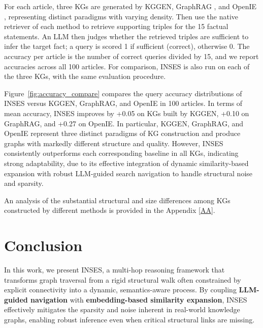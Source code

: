 \documentclass{article}
\theoremstyle{plain}
\theoremstyle{definition}
\theoremstyle{remark}
\begin{document}
For each article, three KGs are generated by KGGEN, GraphRAG \citep{edge2024local}, and OpenIE \citep{angeli2015leveraging}, representing distinct paradigms with varying density. Then use the native retriever of each method to retrieve supporting triples for the 15 factual statements. An LLM then judges whether the retrieved triples are sufficient to infer the target fact; a query is scored 1 if sufficient (correct), otherwise 0. The accuracy per article is the number of correct queries divided by 15, and we report accuracies across all 100 articles. For comparison, INSES is also run on each of the three KGs, with the same evaluation procedure. 

Figure~\ref{fig:accuracy_compare} compares the query accuracy distributions of INSES versus KGGEN, GraphRAG, and OpenIE in 100 articles. In terms of mean accuracy, INSES improves by +0.05 on KGs built by KGGEN, +0.10 on GraphRAG, and +0.27 on OpenIE. In particular, KGGEN, GraphRAG, and OpenIE represent three distinct paradigms of KG construction and produce graphs with markedly different structure and quality. However, INSES consistently outperforms each corresponding baseline in all KGs, indicating strong adaptability, due to its effective integration of dynamic similarity-based expansion with robust LLM-guided search navigation to handle structural noise and sparsity.

An analysis of the substantial structural and size differences among KGs constructed by different methods is provided in the Appendix \ref{AA}.

\section{Conclusion}
In this work, we present INSES, a multi-hop reasoning framework that transforms graph traversal from a rigid structural walk often constrained by explicit connectivity into a dynamic, semantics-aware process. By coupling \textbf{LLM-guided navigation} with \textbf{embedding-based similarity expansion}, INSES effectively mitigates the sparsity and noise inherent in real-world knowledge graphs, enabling robust inference even when critical structural links are missing.
\end{document}
